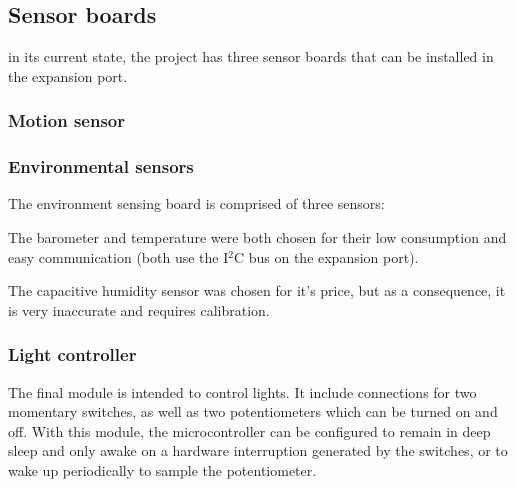 \subsection{Sensor boards}

in its current state, the project has three sensor boards that can be installed
in the expansion port.

\subsubsection{Motion sensor}


\subsubsection{Environmental sensors}

The environment sensing board is comprised of three sensors:



The barometer and temperature were both chosen for their low consumption and
easy communication (both use the I$^{2}$C bus on the expansion port).

The capacitive humidity sensor was chosen for it's price, but as a consequence,
it is very inaccurate and requires calibration.

\subsubsection{Light controller}

The final module is intended to control lights. It include connections for two
momentary switches, as well as two potentiometers which can be turned on and
off. With this module, the microcontroller can be configured to remain in deep
sleep and only awake on a hardware interruption generated by the switches, or to
wake up periodically to sample the potentiometer.





